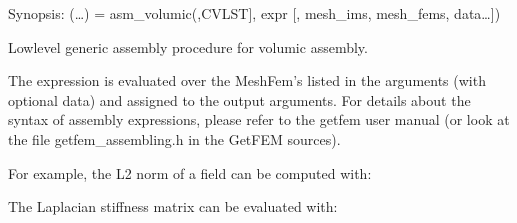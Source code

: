 \documentclass[a4paper,11pt,english]{sphinxmanual}
\begin{document}

\begin{fulllineitems}
\label{\detokenize{python/cmdref_Module asm:getfem.asm_volumic}}
Synopsis: (…) = asm\_volumic(,CVLST{]}, expr {[}, mesh\_ims, mesh\_fems, data…{]})

Low\sphinxhyphen{}level generic assembly procedure for volumic assembly.

The expression  is evaluated over the MeshFem’s listed in the
arguments (with optional data) and assigned to the output arguments.
For details about the syntax of assembly expressions, please refer
to the getfem user manual (or look at the file getfem\_assembling.h
in the GetFEM sources).

For example, the L2 norm of a field can be computed with:

\begin{sphinxVerbatim}[commandchars=\\\{\}]
      

\end{sphinxVerbatim}

The Laplacian stiffness matrix can be evaluated with:

\begin{sphinxVerbatim}[commandchars=\\\{\}]
      

 
\end{sphinxVerbatim}

\end{fulllineitems}
\end{document}
